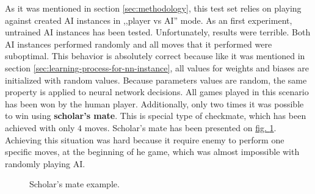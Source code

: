 As it was mentioned in section \ref{sec:methodology}, this test set relies on playing against created AI instances in ,,player vs AI'' mode. As an first experiment, untrained AI instances has been tested. Unfortunately, results were terrible. Both AI instances performed randomly and all moves that it performed were suboptimal. This behavior is absolutely correct because like it was mentioned in section \ref{sec:learning-process-for-nn-instance}, all values for weights and biases are initialized with random values. Because parameters values are random, the same property is applied to neural network decisions. All games played in this scenario has been won by the human player. Additionally, only two times it was possible to win using \textbf{scholar's mate}. This is special type of checkmate, which has been achieved with only $4$ moves. Scholar's mate has been presented on \hyperref[fig:scholars-mate]{fig. \ref*{fig:scholars-mate}}. Achieving this situation was hard because it require enemy to perform one specific moves, at the beginning of he game, which was almost impossible with randomly playing AI.
\begin{figure}
    \centering
    \newchessgame
    \showboard
    \caption{Scholar's mate example.}
    \label{fig:scholars-mate}
\end{figure}

